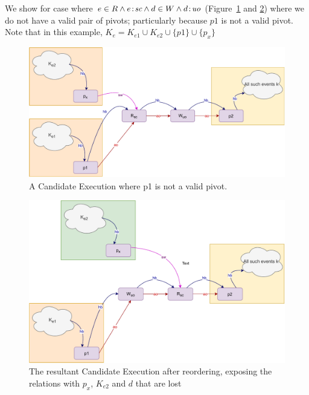    We show for case where $e \in R \wedge e\!:\!\textit{sc} \wedge d \in W \wedge d\!:\!\textit{uo}$ (Figure~\ref{reord:preserve_hb(c)} and \ref{reord:preserve_hb(d)}) where we do not have a valid pair of pivots; particularly because $p1$ is not a valid pivot. 
    Note that in this example, $K_e = K_{e1} \cup K_{e2} \cup \{p1\} \cup \{p_x\}$
    \begin{figure}[H]
        \centering
        \includegraphics[scale=0.6]{4.InstructionReordering/4.ValidReorderingCandidate/ProofParts/Part1/part1(e).pdf}
        \caption{A Candidate Execution where p1 is not a valid pivot.}
        \label{reord:preserve_hb(c)}
    \end{figure}
    
    \begin{figure}[H]
        \centering
        \includegraphics[scale=0.6]{4.InstructionReordering/4.ValidReorderingCandidate/ProofParts/Part1/part1(f).pdf}
        \caption{The resultant Candidate Execution after reordering, exposing the relations with $p_x$, $K_{e2}$ and $d$ that are lost}
        \label{reord:preserve_hb(d)}
    \end{figure}
        

